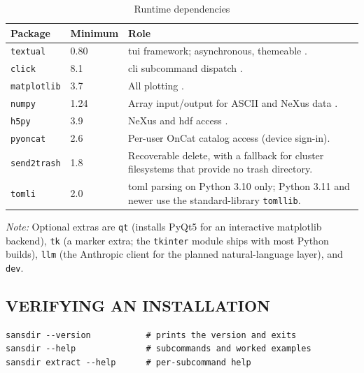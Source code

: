 \documentclass[tm]{ornltm}
\begin{document}
\begin{table}[ht]
  \centering
  \begin{threeparttable}
  \caption{Runtime dependencies}
  \label{tab:deps}
  \small
  \begin{tabular}{l l p{}}
    \toprule
    Package & Minimum & Role \\
    \midrule
    \texttt{textual}    & 0.80  & \Ac{tui} framework; asynchronous, themeable
      \autocite{textual}. \\
    \texttt{click}      & 8.1   & \Ac{cli} subcommand dispatch
      \autocite{click}. \\
    \texttt{matplotlib} & 3.7   & All plotting \autocite{matplotlib}. \\
    \texttt{numpy}      & 1.24  & Array input/output for ASCII and NeXus data
      \autocite{numpy}. \\
    \texttt{h5py}       & 3.9   & NeXus and \ac{hdf} access \autocite{h5py}. \\
    \texttt{pyoncat}    & 2.6   & Per-user OnCat catalog access (device sign-in). \\
    \texttt{send2trash} & 1.8   & Recoverable delete, with a fallback for
      cluster filesystems that provide no trash directory. \\
    \texttt{tomli}      & 2.0   & \Ac{toml} parsing on Python 3.10 only;
      Python 3.11 and newer use the standard-library \texttt{tomllib}. \\
    \bottomrule
  \end{tabular}
  \begin{tablenotes}
    \item \emph{Note:} Optional extras are \texttt{qt} (installs PyQt5 for an
    interactive matplotlib backend), \texttt{tk} (a marker extra; the
    \texttt{tkinter} module ships with most Python builds), \texttt{llm} (the
    Anthropic client for the planned natural-language layer), and \texttt{dev}.
  \end{tablenotes}
  \end{threeparttable}
\end{table}

\subsection{VERIFYING AN INSTALLATION}

\begin{lstlisting}[language=shellsession]
sansdir --version           # prints the version and exits
sansdir --help              # subcommands and worked examples
sansdir extract --help      # per-subcommand help
\end{lstlisting}
\end{document}
